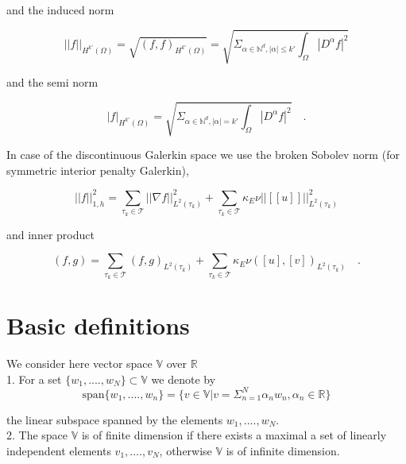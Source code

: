 \documentclass[a4paper]{book}
\begin{document}
and the induced norm 

\begin{equation}
||f||_{H^{k'} (\Omega)} = \sqrt{(f,f)_{H^{k'}(\Omega)}} = \sqrt{\Sigma_{\alpha \in \mathbb{N}^d, |\alpha| \leq k'} \int_\Omega |D^\alpha f|^2}
\end{equation}

and the semi norm 

\begin{equation}
|f|_{H^{k'} (\Omega)} = \sqrt{\Sigma_{\alpha \in \mathbb{N}^d, |\alpha| = k'} \int_\Omega |D^\alpha f|^2} \quad \textrm{.}
\end{equation}

In case of the discontinuous Galerkin space we use the broken Sobolev norm (for symmetric interior penalty Galerkin), \cite{Montlaur2}

\begin{equation}
||f||_{1,h}^2 = \sum_{\tau_k \in \mathcal{T}} ||\nabla f||_{L^2(\tau_k)}^2 + \sum_{\tau_k \in \mathcal{T}} \kappa_E \nu ||[[u]]||_{L^2 (\tau_k)}^2
\end{equation}

and inner product

\begin{equation}
(f,g) = \sum_{\tau_k \in \mathcal{T}} (f,g)_{L^2(\tau_k)} + \sum_{\tau_k \in \mathcal{T}} \kappa_E \nu ([u],[v])_{L^2 (\tau_k)} \quad \textrm{.}
\end{equation}

\section{Basic definitions}

We consider here vector space $\mathbb{V}$ over $\mathbb{R}$\\

1. For a set $\lbrace w_1,....,w_N \rbrace \subset \mathbb{V}$ we denote by \\
\begin{equation} \label{vector space}
\mathrm{span} \lbrace w_1,....,w_n \rbrace = \lbrace v \in \mathbb{V} | v = \Sigma_{n=1}^N \alpha_n w_n, \alpha_n \in \mathbb{R} \rbrace
\end{equation} 

the linear subspace spanned by the elements $w_1,....,w_N$.\\

2. The space $\mathbb{V}$ is of finite dimension if there exists a maximal a set of linearly independent elements $v_1,....,v_N$, otherwise $\mathbb{V}$ is of infinite dimension.\\
\end{document}
